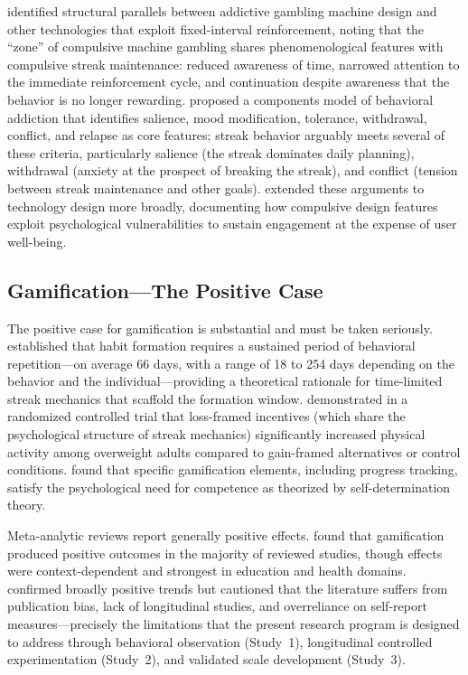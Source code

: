 \documentclass[12pt]{article}
\begin{document}
\citet{Schull2012} identified structural parallels between addictive gambling machine design and other technologies that exploit fixed-interval reinforcement, noting that the ``zone'' of compulsive machine gambling shares phenomenological features with compulsive streak maintenance: reduced awareness of time, narrowed attention to the immediate reinforcement cycle, and continuation despite awareness that the behavior is no longer rewarding. \citet{Griffiths2005} proposed a components model of behavioral addiction that identifies salience, mood modification, tolerance, withdrawal, conflict, and relapse as core features; streak behavior arguably meets several of these criteria, particularly salience (the streak dominates daily planning), withdrawal (anxiety at the prospect of breaking the streak), and conflict (tension between streak maintenance and other goals). \citet{Alter2017} extended these arguments to technology design more broadly, documenting how compulsive design features exploit psychological vulnerabilities to sustain engagement at the expense of user well-being.

\subsection{Gamification---The Positive Case}
\label{sec:lit-gamification-positive}

The positive case for gamification is substantial and must be taken seriously. \citet{Lally2010} established that habit formation requires a sustained period of behavioral repetition---on average 66 days, with a range of 18 to 254 days depending on the behavior and the individual---providing a theoretical rationale for time-limited streak mechanics that scaffold the formation window. \citet{Patel2016} demonstrated in a randomized controlled trial that loss-framed incentives (which share the psychological structure of streak mechanics) significantly increased physical activity among overweight adults compared to gain-framed alternatives or control conditions. \citet{Sailer2017} found that specific gamification elements, including progress tracking, satisfy the psychological need for competence as theorized by self-determination theory.

Meta-analytic reviews report generally positive effects. \citet{Hamari2014} found that gamification produced positive outcomes in the majority of reviewed studies, though effects were context-dependent and strongest in education and health domains. \citet{Koivisto2019} confirmed broadly positive trends but cautioned that the literature suffers from publication bias, lack of longitudinal studies, and overreliance on self-report measures---precisely the limitations that the present research program is designed to address through behavioral observation (Study~1), longitudinal controlled experimentation (Study~2), and validated scale development (Study~3).
\end{document}
